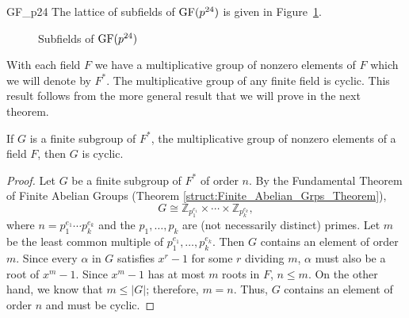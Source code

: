 \begin{example}{GF_p24}
The lattice of subfields of $\operatorname{GF}(p^{24})$ is given in Figure~\ref{FieldLattice}.

\begin{figure}
\begin{center}
\end{center}
\caption{Subfields of $\operatorname{GF}(p^{24})$}
\label{FieldLattice}
\end{figure}

\end{example}
 


With each field $F$ we have a multiplicative group of nonzero elements of $F$ which we will denote by $F^*$\label{ntmultgrp}.   The multiplicative group of any finite field is cyclic.  This result follows from the more general result that we will prove in the next theorem. 

\begin{theorem}\label{finite:mult_group_theorem}
If $G$ is a finite  subgroup of $F^\ast$, the multiplicative group of nonzero elements of a field $F$, then $G$ is cyclic. 
\end{theorem}
 

\begin{proof}
Let $G$ be a finite subgroup of $F^\ast$ of order $n$.  By the Fundamental Theorem of Finite Abelian Groups (Theorem \ref{struct:Finite_Abelian_Grps_Theorem}),  
\[
G \cong {\mathbb Z}_{p_1^{e_1}} \times \cdots \times {\mathbb Z}_{p_k^{e_k}},
\]
where $n = p_1^{e_1} \cdots p_k^{e_k}$ and the  $p_1, \ldots, p_k$ are (not necessarily distinct) primes.
Let $m$ be the least common multiple of $p_1^{e_1}, \ldots, p_k^{e_k}$.  Then $G$ contains an element of order $m$.  Since every $\alpha$ in $G$ satisfies $x^r - 1$ for some $r$ dividing $m$, $\alpha$ must also be a root of $x^m - 1$.  Since $x^m -1$ has at most $m$ roots in $F$, $n \leq m$.  On the other hand, we know that $m \leq |G|$; therefore, $m = n$. Thus, $G$ contains an element of order $n$ and must be cyclic. 
\end{proof}

